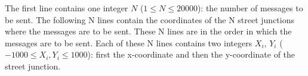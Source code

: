 The first line contains one integer $N$ ($1 \le N \le 20000$): the number of messages to be sent. The following N lines contain the coordinates of the N street junctions where the messages are to be sent. These N lines are in the order in which the messages are to be sent. Each of these N lines contains two integers $X_i$, $Y_i$ ($-1000 \le X_i,Y_i \le 1000$): first the x-coordinate and then the y-coordinate of the street junction. 